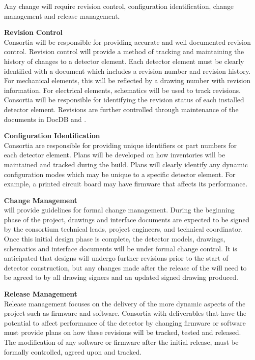 Any change will require revision control, configuration
identification, change management and release management.

{\bf Revision Control}\\ Consortia will be responsible for providing
accurate and well documented revision control.  Revision control
will provide a method of tracking and maintaining the history of
changes to a detector element.  Each detector element must be clearly
identified with a document which includes a revision number and
revision history.  For mechanical elements, this will be reflected by
a drawing number with revision information.  For electrical elements,
schematics will be used to track revisions.  Consortia will be
responsible for identifying the revision status of each installed
detector element. Revisions are further controlled through maintenance
of the documents in DocDB and .

{\bf Configuration Identification}\\
Consortia are responsible for providing unique identifiers or part
numbers for each detector element.  Plans will be developed on how
inventories will be maintained and tracked during the build.  Plans
will clearly identify any dynamic configuration modes which may be
unique to a specific detector element.  For example, a printed circuit
board may have firmware that affects its performance.

{\bf Change Management}\\
 will provide guidelines
for formal change management.  During the beginning phase of the
project, drawings and interface documents are expected to be signed by
the consortium technical leads, project engineers, and technical
coordinator.  Once this initial design phase is complete, the detector
models, drawings, schematics and interface documents will be under
formal change control.  It is anticipated that designs will undergo
further revisions prior to the start of detector construction, but any
changes made after the release of the  will
need to be agreed to by all drawing signers and an updated signed
drawing produced.

{\bf Release Management}\\
Release management focuses on the delivery of the more dynamic aspects
of the project such as firmware and software.  Consortia with
deliverables that have the potential to affect performance of the
detector by changing firmware or software must provide plans on how
these revisions will be tracked, tested and released.  The
modification of any software or firmware after the initial release,
must be formally controlled, agreed upon and tracked.


